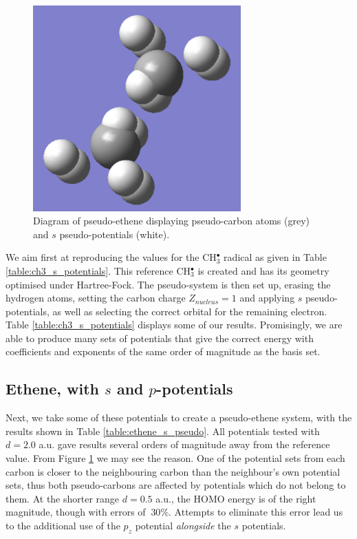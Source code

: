 \documentclass[journal=jctcce,manuscript=article]{achemso}
\begin{document}
\begin{figure}
\includegraphics[width=8cm]{long_r_ethene_diagram.png}
\caption{Diagram of pseudo-ethene displaying pseudo-carbon atoms (grey) and \(s\) pseudo-potentials (white).}
\label{fig:long_r_ethene}
\end{figure}

We aim first at reproducing the values for the CH\(^{\bullet}_{3}\) radical as given in Table \ref{table:ch3_s_potentials}. This reference CH\(^{\bullet}_{3}\) is created and has its geometry optimised under Hartree-Fock. The pseudo-system is then set up, erasing the hydrogen atoms, setting the carbon charge \(Z_{nucleus} = 1\) and applying \(s\) pseudo-potentials, as well as selecting the correct orbital for the remaining electron. Table \ref{table:ch3_s_potentials} displays some of our results. Promisingly, we are able to produce many sets of potentials that give the correct energy with coefficients and exponents of the same order of magnitude as the basis set.

\subsection{Ethene, with \(s\) and \(p\)-potentials}

Next, we take some of these potentials to create a pseudo-ethene system, with the results shown in Table \ref{table:ethene_s_pseudo}. All potentials tested with \(d = 2.0\) a.u. gave results several orders of magnitude away from the reference value. From Figure \ref{fig:long_r_ethene} we may see the reason. One of the potential sets from each carbon is closer to the neighbouring carbon than the neighbour's own potential sets, thus both pseudo-carbons are affected by potentials which do not belong to them. At the shorter range \(d = 0.5\) a.u., the HOMO energy is of the right magnitude, though with errors of \(~ 30\%\). Attempts to eliminate this error lead us to the additional use of the \(p_{z}\) potential \textit{alongside} the \(s\) potentials.
\end{document}
